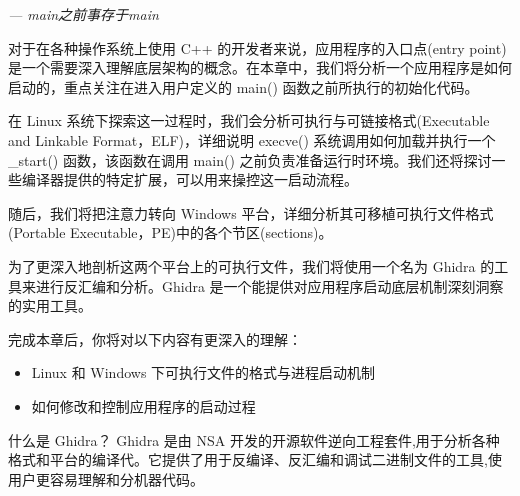 
\begin{flushright}
\textit{--- main之前事存于main}
\end{flushright}

对于在各种操作系统上使用 C++ 的开发者来说，应用程序的入口点(entry point)是一个需要深入理解底层架构的概念。在本章中，我们将分析一个应用程序是如何启动的，重点关注在进入用户定义的 main() 函数之前所执行的初始化代码。

在 Linux 系统下探索这一过程时，我们会分析可执行与可链接格式(Executable and Linkable Format，ELF)，详细说明 execve() 系统调用如何加载并执行一个 \_start() 函数，该函数在调用 main() 之前负责准备运行时环境。我们还将探讨一些编译器提供的特定扩展，可以用来操控这一启动流程。

随后，我们将把注意力转向 Windows 平台，详细分析其可移植可执行文件格式(Portable Executable，PE)中的各个节区(sections)。

为了更深入地剖析这两个平台上的可执行文件，我们将使用一个名为 Ghidra 的工具来进行反汇编和分析。Ghidra 是一个能提供对应用程序启动底层机制深刻洞察的实用工具。

完成本章后，你将对以下内容有更深入的理解：

\begin{itemize}
\item 
Linux 和 Windows 下可执行文件的格式与进程启动机制

\item 
如何修改和控制应用程序的启动过程
\end{itemize}

\begin{myTip}{什么是 Ghidra？}
Ghidra 是由 NSA 开发的开源软件逆向工程套件,用于分析各种格式和平台的编译代。它提供了用于反编译、反汇编和调试二进制文件的工具,使用户更容易理解和分机器代码。
\end{myTip}





